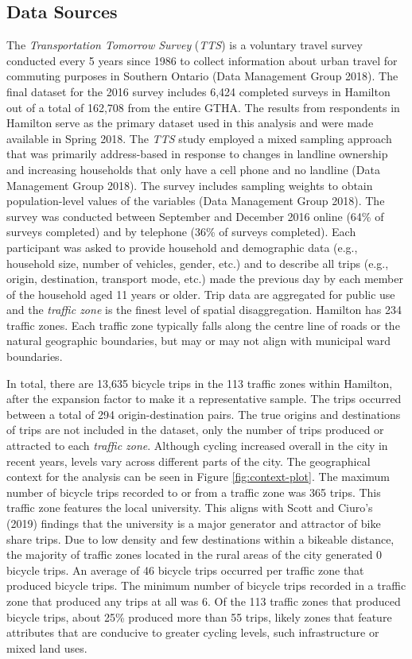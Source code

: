 \documentclass[smallextended]{svjour3}       %
\begin{document}
\hypertarget{data-sources}{%
\subsection{Data Sources}\label{data-sources}}

The \emph{Transportation Tomorrow Survey} (\emph{TTS}) is a voluntary
travel survey conducted every 5 years since 1986 to collect information
about urban travel for commuting purposes in Southern Ontario (Data
Management Group 2018). The final dataset for the 2016 survey includes
6,424 completed surveys in Hamilton out of a total of 162,708 from the
entire GTHA. The results from respondents in Hamilton serve as the
primary dataset used in this analysis and were made available in Spring
2018. The \emph{TTS} study employed a mixed sampling approach that was
primarily address-based in response to changes in landline ownership and
increasing households that only have a cell phone and no landline (Data
Management Group 2018). The survey includes sampling weights to obtain
population-level values of the variables (Data Management Group 2018).
The survey was conducted between September and December 2016 online
(64\% of surveys completed) and by telephone (36\% of surveys
completed). Each participant was asked to provide household and
demographic data (e.g., household size, number of vehicles, gender,
etc.) and to describe all trips (e.g., origin, destination, transport
mode, etc.) made the previous day by each member of the household aged
11 years or older. Trip data are aggregated for public use and the
\emph{traffic zone} is the finest level of spatial disaggregation.
Hamilton has 234 traffic zones. Each traffic zone typically falls along
the centre line of roads or the natural geographic boundaries, but may
or may not align with municipal ward boundaries.

In total, there are 13,635 bicycle trips in the 113 traffic zones within
Hamilton, after the expansion factor to make it a representative sample.
The trips occurred between a total of 294 origin-destination pairs. The
true origins and destinations of trips are not included in the dataset,
only the number of trips produced or attracted to each \emph{traffic
zone}. Although cycling increased overall in the city in recent years,
levels vary across different parts of the city. The geographical context
for the analysis can be seen in Figure \ref{fig:context-plot}. The
maximum number of bicycle trips recorded to or from a traffic zone was
365 trips. This traffic zone features the local university. This aligns
with Scott and Ciuro's (2019) findings that the university is a major
generator and attractor of bike share trips. Due to low density and few
destinations within a bikeable distance, the majority of traffic zones
located in the rural areas of the city generated 0 bicycle trips. An
average of 46 bicycle trips occurred per traffic zone that produced
bicycle trips. The minimum number of bicycle trips recorded in a traffic
zone that produced any trips at all was 6. Of the 113 traffic zones that
produced bicycle trips, about 25\% produced more than 55 trips, likely
zones that feature attributes that are conducive to greater cycling
levels, such infrastructure or mixed land uses.
\end{document}
